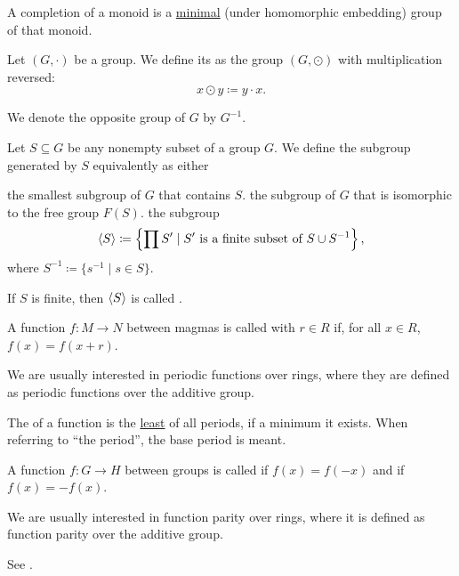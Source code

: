\begin{definition}\label{def:monoid_completion}
  A completion of a monoid is a \hyperref[def:preordered_set/maximal_minimal_element]{minimal} (under homomorphic embedding) group of that monoid.
\end{definition}

\begin{definition}\label{def:opposite_group}
  Let \( (G, \cdot) \) be a group. We define its  as the group \( (G, \odot) \) with multiplication reversed:
  \begin{equation*}
    x \odot y \coloneqq y \cdot x.
  \end{equation*}

  We denote the opposite group of \( G \) by \( G^{-1} \).
\end{definition}

\begin{definition}\label{def:generated_subgroup}
  Let \( S \subseteq G \) be any nonempty subset of a group \( G \). We define the subgroup generated by \( S \) equivalently as either
  \begin{DefEnum}
     the smallest subgroup of \( G \) that contains \( S \).
     the subgroup of \( G \) that is isomorphic to the free group \( F(S) \).
     the subgroup
    \begin{equation*}
      \left\langle S \right\rangle \coloneqq \left\{ \prod S' \mid S' \text{ is a finite subset of } S \cup S^{-1} \right\},
    \end{equation*}
    where \( S^{-1} \coloneqq \{ s^{-1} \mid s \in S \} \).
  \end{DefEnum}

  If \( S \) is finite, then \( \left\langle S \right\rangle \) is called .
\end{definition}

\begin{definition}\label{def:periodic_function}
  A function \( f: M \to N \) between magmas is called  with  \( r \in R \) if, for all \( x \in R \), \( f(x) = f(x + r) \).

  We are usually interested in periodic functions over rings, where they are defined as periodic functions over the additive group.

  The  of a function is the \hyperref[def:preordered_set/largest_smallest_element]{least} of all periods, if a minimum it exists. When referring to \enquote{the period}, the base period is meant.
\end{definition}

\begin{definition}\label{def:function_pairity}
  A function \( f: G \to H \) between groups is called  if \( f(x) = f(-x) \) and  if \( f(x) = -f(x) \).

  We are usually interested in function parity over rings, where it is defined as function parity over the additive group.

  See .
\end{definition}

